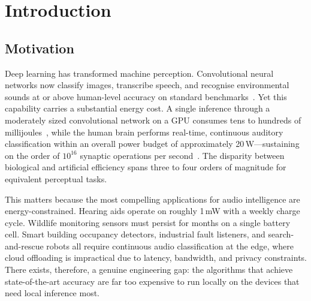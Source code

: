\chapter{Introduction}
\label{ch:introduction}

\section{Motivation}
\label{sec:motivation}

Deep learning has transformed machine perception.
Convolutional neural networks now classify images, transcribe speech, and recognise environmental sounds at or above human-level accuracy on standard benchmarks~\citep{kong2020panns, gong2021ast}.
Yet this capability carries a substantial energy cost.
A single inference through a moderately sized convolutional network on a GPU consumes tens to hundreds of millijoules~\citep{yik2025neurobench}, while the human brain performs real-time, continuous auditory classification within an overall power budget of approximately 20\,W---sustaining on the order of $10^{16}$ synaptic operations per second~\citep{attwell2001energy}.
The disparity between biological and artificial efficiency spans three to four orders of magnitude for equivalent perceptual tasks.

This matters because the most compelling applications for audio intelligence are energy-constrained.
Hearing aids operate on roughly 1\,mW with a weekly charge cycle.
Wildlife monitoring sensors must persist for months on a single battery cell.
Smart building occupancy detectors, industrial fault listeners, and search-and-rescue robots all require continuous audio classification at the edge, where cloud offloading is impractical due to latency, bandwidth, and privacy constraints.
There exists, therefore, a genuine engineering gap: the algorithms that achieve state-of-the-art accuracy are far too expensive to run locally on the devices that need local inference most.

